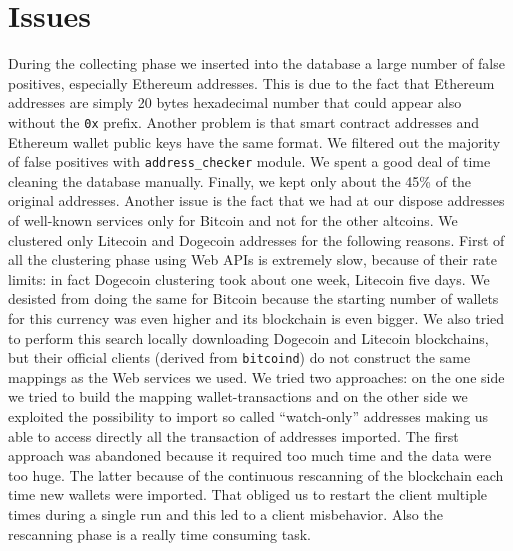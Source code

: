 \section{Issues} \label{sec:issues}
During the collecting phase we inserted into the database a large number of
false positives, especially Ethereum addresses. This is due to the fact that
Ethereum addresses are simply 20 bytes hexadecimal number that could appear
also without the \texttt{0x} prefix. Another problem is that smart contract
addresses and Ethereum wallet public keys have the same format. We filtered out
the majority of false positives with \texttt{address\_checker} module. We spent
a good deal of time cleaning the database manually. Finally, we kept only about
the 45\% of the original addresses.
Another issue is the fact that we had at our dispose addresses
of well-known services only for Bitcoin and not for the other altcoins.
We clustered only Litecoin and Dogecoin addresses for the following reasons.
First of all the clustering phase using Web APIs is extremely slow, because of
their rate limits: in fact Dogecoin clustering took about one week, Litecoin
five days.
We desisted from doing the same for Bitcoin because the starting number of
wallets for this currency was even higher and its blockchain is even bigger. We
also tried to perform this search locally downloading Dogecoin and Litecoin
blockchains, but their official clients (derived from \texttt{bitcoind}) do not
construct the same mappings as the Web services we used. We tried two
approaches: on the one side we tried to build the mapping wallet-transactions
and on the other side we exploited the possibility to import so called
``watch-only'' addresses making us able to access directly all the transaction
of addresses imported. The first approach was abandoned because it
required too much time and the data were too huge. The latter because of the
continuous rescanning of the blockchain each time new wallets were imported.
That obliged us to restart the client multiple times during a single run and
this led to a client misbehavior. Also the rescanning phase is a really
time consuming task.
